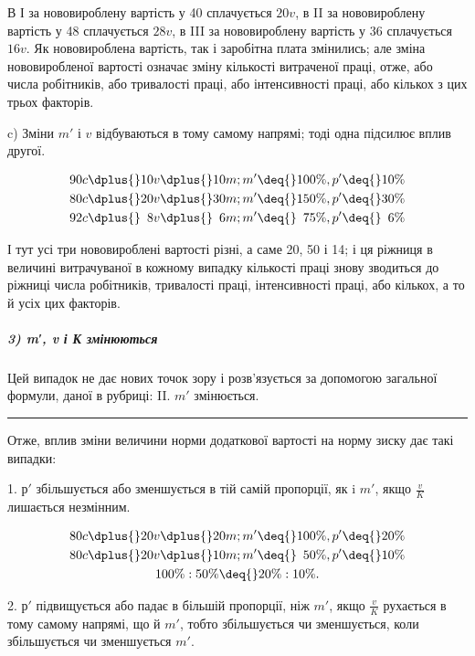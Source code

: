 
В І за нововироблену вартість у 40 сплачується $20 v$, в II
за нововироблену вартість у 48 сплачується $28 v$, в III за нововироблену
вартість у 36 сплачується $16 v$. Як нововироблена
вартість, так і заробітна плата змінились; але зміна нововиробленої
вартості означає зміну кількості витраченої праці, отже,
або числа робітників, або тривалості праці, або інтенсивності
праці, або кількох з цих трьох факторів.

c) Зміни $m'$ і $v$ відбуваються в тому самому напрямі; тоді
одна підсилює вплив другої.

\begin{gather*}
90 c \dplus{} 10 v \dplus{} 10 m; m' \deq{} 100\%, p' \deq{} 10\% \\
80 c \dplus{} 20 v \dplus{} 30 m; m' \deq{} 150\%, p' \deq{} 30\% \\
92 c \dplus{} \phantom{0}8 v \dplus{} \phantom{0}6 m; m' \deq{} \phantom{1}75\%, p' \deq{} \phantom{1}6\%
\end{gather*}

\noindent{}І тут усі три нововироблені вартості різні, а саме 20, 50 і 14;
і ця ріжниця в величині витрачуваної в кожному випадку кількості
праці знову зводиться до ріжниці числа робітників, тривалості
праці, інтенсивності праці, або кількох, а то й усіх цих факторів.



\subparagraph*{3) m′, v і К змінюються}
Цей випадок не дає нових точок зору і розв’язується за допомогою
загальної формули, даної в рубриці: II. $m'$ змінюється.

\pfbreak{}

Отже, вплив зміни величини норми додаткової вартості на
норму зиску дає такі випадки:

1. $р'$ збільшується або зменшується в тій самій пропорції, як
i $m'$, якщо $\frac{v}{K}$  лишається незмінним.

\begin{gather*}
80 c \dplus{} 20 v \dplus{} 20 m; m' \deq{} 100\%, p' \deq{} 20\% \\
80 c \dplus{} 20 v \dplus{} 10 m; m' \deq{} \phantom{1}50\%, p' \deq{} 10\% \\
100\% : 50\% \deq{} 20\% : 10\%.
\end{gather*}

2. $р'$ підвищується або падає в більшій пропорції, ніж $m'$,
якщо $\frac{v}{K}$ рухається в тому самому напрямі, що й $m'$, тобто
збільшується чи зменшується, коли збільшується чи зменшується
$m'$.

